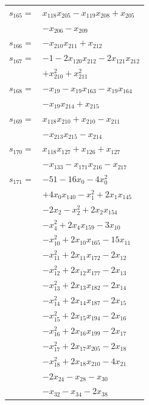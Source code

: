 \begin{longtable}{@{}r@{\;}l@{}}
\(s_{165}=\) & \(\displaystyle x_{118}x_{205} -x_{119}x_{208} +x_{205}\) \\
 & \(\displaystyle -x_{206} -x_{209}\) \\[3pt]
\(s_{166}=\) & \(\displaystyle -x_{210}x_{211} +x_{212}\) \\[3pt]
\(s_{167}=\) & \(\displaystyle -1 -2x_{120}x_{212} -2x_{121}x_{212}\) \\
 & \(\displaystyle +x_{210}^{2} +x_{211}^{2}\) \\[3pt]
\(s_{168}=\) & \(\displaystyle -x_{19} -x_{19}x_{163} -x_{19}x_{164}\) \\
 & \(\displaystyle -x_{19}x_{214} +x_{215}\) \\[3pt]
\(s_{169}=\) & \(\displaystyle x_{118}x_{210} +x_{210} -x_{211}\) \\
 & \(\displaystyle -x_{213}x_{215} -x_{214}\) \\[3pt]
\(s_{170}=\) & \(\displaystyle x_{118}x_{127} +x_{126} +x_{127}\) \\
 & \(\displaystyle -x_{133} -x_{171}x_{216} -x_{217}\) \\[3pt]
\(s_{171}=\) & \(\displaystyle -51 -16x_{0} -4x_{0}^{2}\) \\
 & \(\displaystyle +4x_{0}x_{140} -x_{1}^{2} +2x_{1}x_{145}\) \\
 & \(\displaystyle -2x_{2} -x_{2}^{2} +2x_{2}x_{154}\) \\
 & \(\displaystyle -x_{4}^{2} +2x_{4}x_{159} -3x_{10}\) \\
 & \(\displaystyle -x_{10}^{2} +2x_{10}x_{165} -15x_{11}\) \\
 & \(\displaystyle -x_{11}^{2} +2x_{11}x_{172} -2x_{12}\) \\
 & \(\displaystyle -x_{12}^{2} +2x_{12}x_{177} -2x_{13}\) \\
 & \(\displaystyle -x_{13}^{2} +2x_{13}x_{182} -2x_{14}\) \\
 & \(\displaystyle -x_{14}^{2} +2x_{14}x_{187} -2x_{15}\) \\
 & \(\displaystyle -x_{15}^{2} +2x_{15}x_{194} -2x_{16}\) \\
 & \(\displaystyle -x_{16}^{2} +2x_{16}x_{199} -2x_{17}\) \\
 & \(\displaystyle -x_{17}^{2} +2x_{17}x_{205} -2x_{18}\) \\
 & \(\displaystyle -x_{18}^{2} +2x_{18}x_{210} -4x_{21}\) \\
 & \(\displaystyle -2x_{24} -x_{28} -x_{30}\) \\
 & \(\displaystyle -x_{32} -x_{34} -2x_{38}\) \\

\end{longtable}
